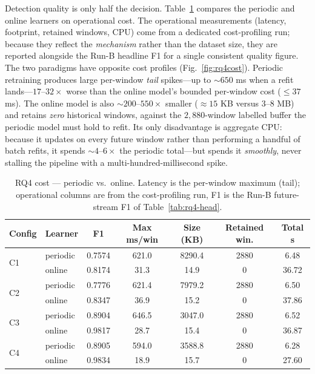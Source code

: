 \documentclass[acmsmall]{acmart}
\begin{document}
Detection quality is only half the decision. Table~\ref{tab:rq4-cost} compares the periodic and online learners on operational cost. The operational measurements (latency, footprint, retained windows, CPU) come from a dedicated cost-profiling run; because they reflect the \emph{mechanism} rather than the dataset size, they are reported alongside the Run-B headline F1 for a single consistent quality figure. The two paradigms have opposite cost profiles (Fig.~\ref{fig:rq4cost}). Periodic retraining produces large per-window \emph{tail} spikes---up to $\sim 650$ ms when a refit lands---$17$--$32\times$ worse than the online model's bounded per-window cost ($\leq 37$ ms). The online model is also $\sim 200$--$550\times$ smaller ($\approx 15$ KB versus $3$--$8$ MB) and retains \emph{zero} historical windows, against the $2{,}880$-window labelled buffer the periodic model must hold to refit. Its only disadvantage is aggregate CPU: because it updates on every future window rather than performing a handful of batch refits, it spends $\sim 4$--$6\times$ the periodic total---but spends it \emph{smoothly}, never stalling the pipeline with a multi-hundred-millisecond spike.

\begin{table}[t]
\caption{RQ4 cost --- periodic vs.\ online. Latency is the per-window maximum (tail); operational columns are from the cost-profiling run, F1 is the Run-B future-stream F1 of Table~\ref{tab:rq4-head}.}\label{tab:rq4-cost}
\begin{tabular}{@{}llccccc@{}}
\toprule
Config & Learner & F1 & Max ms/win & Size (KB) & Retained win. & Total s \\
\midrule
\multirow{2}{*}{C1} & periodic & 0.7574 & 621.0 & 8290.4 & 2880 & 6.48 \\
                    & online   & 0.8174 & 31.3  & 14.9   & 0    & 36.72 \\
\midrule
\multirow{2}{*}{C2} & periodic & 0.7776 & 621.4 & 7979.2 & 2880 & 6.50 \\
                    & online   & 0.8347 & 36.9  & 15.2   & 0    & 37.86 \\
\midrule
\multirow{2}{*}{C3} & periodic & 0.8904 & 646.5 & 3047.0 & 2880 & 6.52 \\
                    & online   & 0.9817 & 28.7  & 15.4   & 0    & 36.87 \\
\midrule
\multirow{2}{*}{C4} & periodic & 0.8905 & 594.0 & 3588.8 & 2880 & 6.28 \\
                    & online   & 0.9834 & 18.9  & 15.7   & 0    & 27.60 \\
\bottomrule
\end{tabular}
\end{table}
\end{document}
